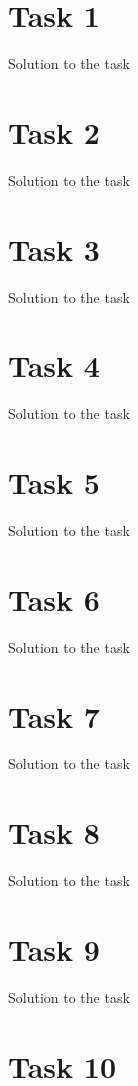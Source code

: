 \documentclass[a4paper,12pt,oneside,onecolumn]{article} %
\begin{document}
\section*{Task 1}

Solution to the task

\section*{Task 2}

Solution to the task

\section*{Task 3}

Solution to the task

\section*{Task 4}

Solution to the task

\section*{Task 5}

Solution to the task

\section*{Task 6}

Solution to the task

\section*{Task 7}

Solution to the task

\section*{Task 8}

Solution to the task

\section*{Task 9}

Solution to the task

\section*{Task 10}
\end{document}

